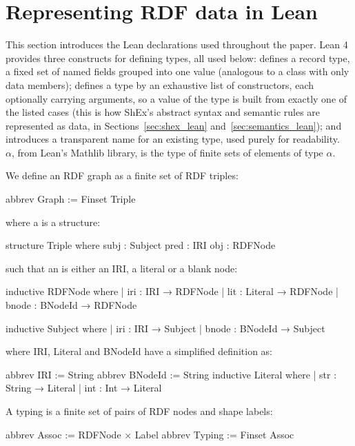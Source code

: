 \section{Representing RDF data in Lean} \label{sec:rdf_in_lean}

This section introduces the Lean declarations used throughout the paper.
Lean 4 provides three constructs for defining types, all used below:
 defines a record type, a fixed set of named fields
grouped into one value (analogous to a class with only data members);
 defines a type by an exhaustive list of constructors,
each optionally carrying arguments, so a value of the type is built from
exactly one of the listed cases (this is how ShEx's abstract syntax and
semantic rules are represented as data, in Sections~\ref{sec:shex_lean}
and~\ref{sec:semantics_lean}); and  introduces a transparent
name for an existing type, used purely for readability. ~$\alpha$,
from Lean's Mathlib library, is the type of finite sets of elements of
type $\alpha$.

We define an RDF graph as a finite set of RDF triples:

\begin{leanlisting} 
 abbrev Graph := Finset Triple
\end{leanlisting} 

where a  is a structure:

\begin{leanlisting}
structure Triple where
  subj : Subject
  pred : IRI
  obj  : RDFNode
\end{leanlisting}

such that an  is either an IRI, a literal or a blank node:
\begin{leanlisting}
inductive RDFNode where
  | iri   : IRI → RDFNode
  | lit   : Literal → RDFNode
  | bnode : BNodeId → RDFNode

inductive Subject where
  | iri   : IRI → Subject
  | bnode : BNodeId → Subject
\end{leanlisting}

where IRI, Literal and BNodeId have a simplified definition as:
\begin{leanlisting}
abbrev IRI := String
abbrev BNodeId := String  
inductive Literal where
  | str : String → Literal
  | int : Int → Literal
\end{leanlisting}

A typing is a finite set of pairs of RDF nodes and shape labels:
\begin{leanlisting}
abbrev Assoc  := RDFNode × Label
abbrev Typing := Finset Assoc
\end{leanlisting}

